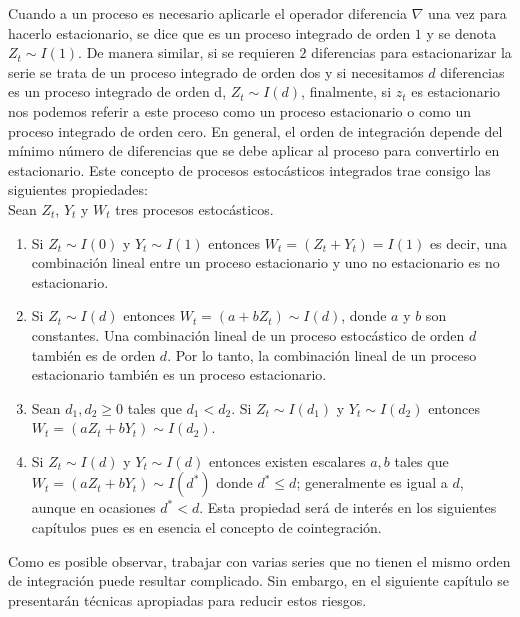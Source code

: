 Cuando a un proceso es necesario aplicarle el operador diferencia $\nabla$  una vez para hacerlo estacionario, se dice que es un proceso integrado de orden $1$ y se denota $Z_t \sim I(1)$. De manera similar, si se requieren $2$ diferencias para estacionarizar la serie se trata de un proceso integrado de orden dos y si necesitamos $d$ diferencias es un proceso integrado de orden d,  $Z_t \sim I(d)$, finalmente, si $z_t$ es estacionario nos podemos referir a este proceso como un proceso estacionario o como un proceso integrado de orden cero. En general, el orden de integración depende del mínimo número de diferencias que se debe aplicar al proceso para convertirlo en estacionario. Este concepto de procesos estocásticos integrados trae consigo las siguientes propiedades:\\

Sean $Z_t$, $Y_t$ y $W_t$ tres procesos estocásticos.

\begin{enumerate}%

\item
 Si $Z_t \sim I(0)$ y  $Y_t \sim I(1)$ entonces $W_t=(Z_t+Y_t) = I(1)$ es decir, una combinación lineal entre un proceso estacionario y uno no estacionario es no estacionario.

\item
Si $Z_t \sim I(d)$ entonces $W_t=(a+bZ_t) \sim I(d)$, donde $a$ y $b$ son constantes. Una combinación lineal de un proceso estocástico de orden $d$ también es de orden $d$. Por lo tanto, la combinación lineal de un proceso estacionario también es un proceso estacionario.

\item 
Sean $d_1,d_2 \geq 0$ tales que  $d_1<d_2$. Si $Z_t \sim I(d_1)$ y $Y_t \sim I(d_2)$ entonces $W_t=(aZ_t+bY_t) \sim I(d_2)$.


\item
Si $Z_t \sim I(d)$  y $Y_t \sim I(d)$ entonces existen escalares $a,b$ tales que $W_t=(aZ_t+bY_t) \sim I(d^*)$ donde $d^* \leq d$; generalmente es igual a $d$, aunque en ocasiones $d^* < d$. Esta propiedad será de interés en los siguientes capítulos pues es en esencia el concepto de cointegración.

\end{enumerate}

Como es posible observar, trabajar con varias series que no tienen el mismo orden de integración puede resultar complicado. Sin embargo, en el siguiente capítulo se presentarán técnicas apropiadas para reducir estos riesgos. 




